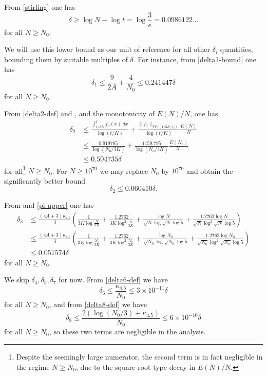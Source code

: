 \documentclass[12pt,a4paper,reqno]{amsart}
\numberwithin{equation}{section}
\theoremstyle{plain}
\theoremstyle{definition}
\begin{document}
From \eqref{stirling} one has
$$ \delta \geq \log N - \log t = \log \frac{3}{e} = 0.0986122\dots$$
for all $N \geq N_0$.  

We will use this lower bound as our unit of reference for all other $\delta_i$ quantities, bounding them by suitable multiples of $\delta$.  For instance, from \eqref{delta1-bound} one has
$$ \delta_1 \leq \frac{9}{2A} + \frac{4}{N_0} \leq 0.241447 \delta$$
for all $N \geq N_0$.

From \eqref{delta2-def} and , and the monotonicity of $E(N)/N$, one has
\begin{align*}
  \delta_2 &\leq \frac{\int_{1/3K}^1 f_3(x)\ dx}{\log(t/K)}  + \frac{\|f_3\|_{\mathrm{TV}((1/3K,1])}}{\log(t/K)}  \frac{E(N)}{N} \\
  &\leq \frac{0.919785}{\log(N_0/3K)}  + \frac{1159.795}{\log(N_0/3K)}  \frac{E(N_0)}{N_0} \\
  &\leq 0.504735 \delta
\end{align*}
for all\footnote{Despite the seemingly large numerator, the second term is in fact negligible in the regime $N \geq N_0$, due to the square root type decay in $E(N)/N$.} $N \geq N_0$.  For $N \geq 10^{70}$ we may replace $N_0$ by $10^{70}$ and obtain the significantly better bound
$$ \delta_2 \leq 0.060410 \delta.$$

From  and \eqref{pi-upper} one has
\begin{align*}
\delta_3 &\leq \frac{(4A+3)\kappa_{4.5}}{3} \left(
\frac{1}{3K \log \frac{N}{3K}} + \frac{1.2762}{3K \log^2 \frac{N}{3K}}
+ \frac{\log N}{\sqrt{N} \log \sqrt{N}\log 5 } + \frac{1.2762 \log N}{\sqrt{N} \log^2 \sqrt{N}\log 5 } \right) \\
&\leq \frac{(4A+3)\kappa_{4.5}}{3} \left(
  \frac{1}{3K \log\frac{N_0}{3K}} + \frac{1.2762}{3K \log^2\frac{N_0}{3K}}
  + \frac{\log N_0}{\sqrt{N_0} \log \sqrt{N_0}\log 5 } + \frac{1.2762 \log N_0}{\sqrt{N_0} \log^2 \sqrt{N_0}\log 5 } \right) \\
&\leq 0.051574 \delta
\end{align*}
for all $N \geq N_0$.

We skip $\delta_4, \delta_5, \delta_7$ for now.  From \eqref{delta6-def} we have
$$ \delta_6 \leq \frac{\kappa_{4.5}}{N_0} \leq 3 \times 10^{-11} \delta$$
for all $N \geq N_0$, and from \eqref{delta8-def} we have
$$ \delta_8 \leq \frac{2(\log(N_0/3) + \kappa_{4.5})}{N_0} \leq 6 \times 10^{-10} \delta$$
for all $N \geq N_0$, so these two terms are negligible in the analysis.
\end{document}
